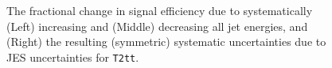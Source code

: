 \begin{figure}[h!]
  \begin{center}
    \\
    \\
    \caption{\label{fig:sms-jes-t2tt}The fractional change in
      signal efficiency due to systematically (Left) increasing and
      (Middle) decreasing all jet energies, and (Right) the resulting
      (symmetric) systematic uncertainties due to JES uncertainties
      for \texttt{T2tt}.}
  \end{center}
\end{figure}

